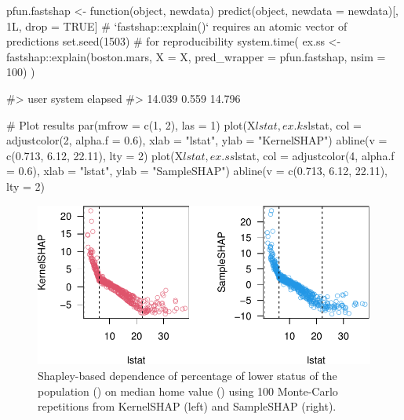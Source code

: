 \begin{Schunk}
\begin{Sinput}
pfun.fastshap <- function(object, newdata) {
  predict(object, newdata = newdata)[, 1L, drop = TRUE]
}  # `fastshap::explain()` requires an atomic vector of predictions
set.seed(1503)  # for reproducibility
system.time({
  ex.ss <- fastshap::explain(boston.mars, X = X, pred_wrapper = pfun.fastshap,
                             nsim = 100)
})
\end{Sinput}
\begin{Soutput}
#>    user  system elapsed 
#>  14.039   0.559  14.796
\end{Soutput}
\begin{Sinput}
# Plot results
par(mfrow = c(1, 2), las = 1)
plot(X$lstat, ex.ks$lstat, col = adjustcolor(2, alpha.f = 0.6),
     xlab = "lstat", ylab = "KernelSHAP")
abline(v = c(0.713, 6.12, 22.11), lty = 2)
plot(X$lstat, ex.ss$lstat, col = adjustcolor(4, alpha.f = 0.6),
     xlab = "lstat", ylab = "SampleSHAP")
abline(v = c(0.713, 6.12, 22.11), lty = 2)
\end{Sinput}
\begin{figure}[!htb]

{\centering \includegraphics[width=1\linewidth]{greenwell_files/figure-latex/ex-boston-mars-SampleSHAP-1} 

}

\caption[Shapley-based dependence of percentage of lower status of the population () on median home value () using 100 Monte-Carlo repetitions from KernelSHAP (left) and SampleSHAP (right)]{Shapley-based dependence of percentage of lower status of the population () on median home value () using 100 Monte-Carlo repetitions from KernelSHAP (left) and SampleSHAP (right).}\label{fig:ex-boston-mars-SampleSHAP}
\end{figure}
\end{Schunk}

